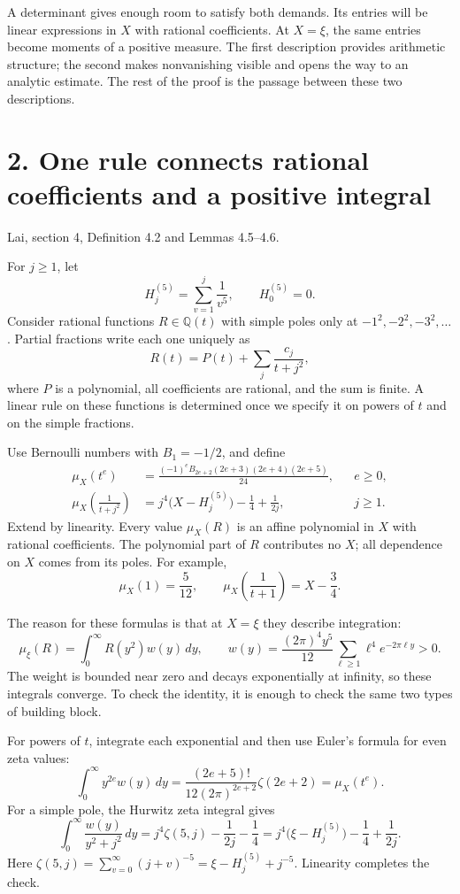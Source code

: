 \documentclass[11pt]{article}
\newcommand{\Q}{\mathbb Q}
\newcommand{\dd}{\,d}
\newcommand{\Hfive}[1]{H_{#1}^{(5)}}
\newcommand{\source}[1]{{\small\color{blue!45!black}#1}\par}
\begin{document}
A determinant gives enough room to satisfy both demands. Its entries will
be linear expressions in $X$ with rational coefficients. At $X=\xi$, the
same entries become moments of a positive measure. The first description
provides arithmetic structure; the second makes nonvanishing visible and
opens the way to an analytic estimate. The rest of the proof is the passage
between these two descriptions.

\newpage
\section*{2. One rule connects rational coefficients and a positive integral}
\source{Lai, section 4, Definition 4.2 and Lemmas 4.5--4.6.}
For $j\geq1$, let
\[
 \Hfive{j}=\sum_{v=1}^j\frac1{v^5},\qquad \Hfive{0}=0.
\]
Consider rational functions $R\in\Q(t)$ with simple poles only at
$-1^2,-2^2,-3^2,\ldots$. Partial fractions write each one uniquely as
\[
 R(t)=P(t)+\sum_j\frac{c_j}{t+j^2},
\]
where $P$ is a polynomial, all coefficients are rational, and the sum is
finite. A linear rule on these functions is determined once we specify it
on powers of $t$ and on the simple fractions.

Use Bernoulli numbers with $B_1=-1/2$, and define
\begin{align*}
 \mu_X(t^e)&=\frac{(-1)^eB_{2e+2}(2e+3)(2e+4)(2e+5)}{24},
       && e\geq0,\\
 \mu_X\!\left(\frac1{t+j^2}\right)
   &=j^4\bigl(X-\Hfive{j}\bigr)-\frac14+\frac1{2j},
       && j\geq1.
\end{align*}
Extend by linearity. Every value $\mu_X(R)$ is an affine polynomial in $X$
with rational coefficients. The polynomial part of $R$ contributes no $X$;
all dependence on $X$ comes from its poles. For example,
\[
 \mu_X(1)=\frac5{12},\qquad
 \mu_X\!\left(\frac1{t+1}\right)=X-\frac34.
\]

The reason for these formulas is that at $X=\xi$ they describe integration:
\[
 \boxed{\mu_\xi(R)=\int_0^\infty R(y^2)w(y)\dd y},\qquad
 w(y)=\frac{(2\pi)^4y^5}{12}
       \sum_{\ell\geq1}\ell^4e^{-2\pi\ell y}>0.
\]
The weight is bounded near zero and decays exponentially at infinity, so
these integrals converge. To check the identity, it is enough to check the
same two types of building block.

For powers of $t$, integrate each exponential and then use Euler's formula
for even zeta values:
\[
 \int_0^\infty y^{2e}w(y)\dd y
 =\frac{(2e+5)!}{12(2\pi)^{2e+2}}\zeta(2e+2)
 =\mu_X(t^e).
\]
For a simple pole, the Hurwitz zeta integral gives
\[
 \int_0^\infty\frac{w(y)}{y^2+j^2}\dd y
 =j^4\zeta(5,j)-\frac1{2j}-\frac14
 =j^4\bigl(\xi-\Hfive{j}\bigr)-\frac14+\frac1{2j}.
\]
Here $\zeta(5,j)=\sum_{v=0}^\infty(j+v)^{-5}
=\xi-\Hfive{j}+j^{-5}$. Linearity completes the check.
\end{document}
